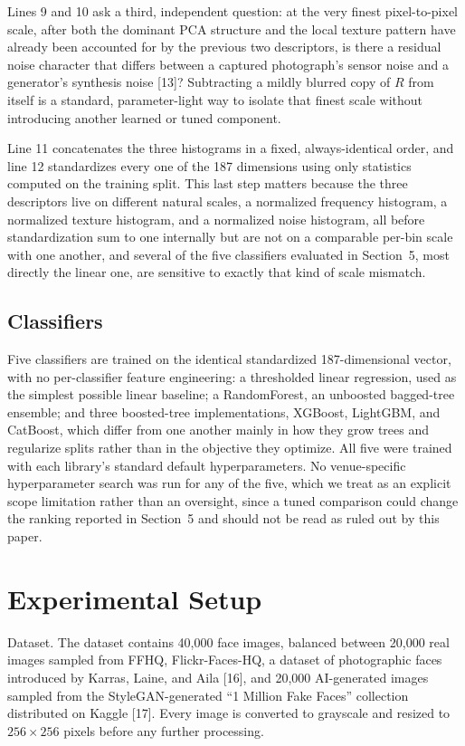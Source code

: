 \documentclass[11pt]{article}
\begin{document}
Lines 9 and 10 ask a third, independent question: at the very finest pixel-to-pixel scale, after both the dominant PCA structure and the local texture pattern have already been accounted for by the previous two descriptors, is there a residual noise character that differs between a captured photograph's sensor noise and a generator's synthesis noise [13]? Subtracting a mildly blurred copy of $R$ from itself is a standard, parameter-light way to isolate that finest scale without introducing another learned or tuned component.

Line 11 concatenates the three histograms in a fixed, always-identical order, and line 12 standardizes every one of the 187 dimensions using only statistics computed on the training split. This last step matters because the three descriptors live on different natural scales, a normalized frequency histogram, a normalized texture histogram, and a normalized noise histogram, all before standardization sum to one internally but are not on a comparable per-bin scale with one another, and several of the five classifiers evaluated in Section~5, most directly the linear one, are sensitive to exactly that kind of scale mismatch.

\subsection{Classifiers}

Five classifiers are trained on the identical standardized 187-dimensional vector, with no per-classifier feature engineering: a thresholded linear regression, used as the simplest possible linear baseline; a RandomForest, an unboosted bagged-tree ensemble; and three boosted-tree implementations, XGBoost, LightGBM, and CatBoost, which differ from one another mainly in how they grow trees and regularize splits rather than in the objective they optimize. All five were trained with each library's standard default hyperparameters. No venue-specific hyperparameter search was run for any of the five, which we treat as an explicit scope limitation rather than an oversight, since a tuned comparison could change the ranking reported in Section~5 and should not be read as ruled out by this paper.

\section{Experimental Setup}

Dataset. The dataset contains 40,000 face images, balanced between 20,000 real images sampled from FFHQ, Flickr-Faces-HQ, a dataset of photographic faces introduced by Karras, Laine, and Aila [16], and 20,000 AI-generated images sampled from the StyleGAN-generated ``1 Million Fake Faces'' collection distributed on Kaggle [17]. Every image is converted to grayscale and resized to $256\times256$ pixels before any further processing.
\end{document}
